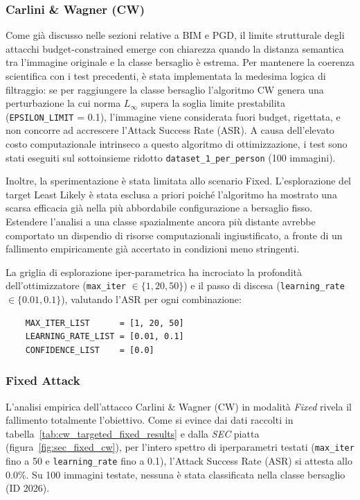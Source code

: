 \documentclass[a4paper, 12pt]{article}
\begin{document}
\subsubsection{Carlini \& Wagner (CW)}
Come già discusso nelle sezioni relative a BIM e PGD, il limite strutturale degli attacchi budget-constrained
emerge con chiarezza quando la distanza semantica tra l'immagine originale e la classe bersaglio è estrema. 
Per mantenere la coerenza scientifica con i test precedenti, è stata implementata la medesima logica di filtraggio: 
se per raggiungere la classe bersaglio l'algoritmo CW genera una perturbazione la cui norma $L_\infty$ supera la soglia
limite prestabilita (\texttt{EPSILON\_LIMIT} = 0.1), l'immagine viene considerata fuori budget, rigettata, e 
non concorre ad accrescere l'Attack Success Rate (ASR).
A causa dell'elevato costo computazionale intrinseco a questo algoritmo di ottimizzazione, 
i test sono stati eseguiti sul sottoinsieme ridotto \texttt{dataset\_1\_per\_person} (100 immagini). 

Inoltre, la sperimentazione è stata limitata allo scenario Fixed. L'esplorazione del target Least Likely
è stata esclusa a priori poiché l'algoritmo ha mostrato una scarsa efficacia già nella più abbordabile configurazione a 
bersaglio fisso. Estendere l'analisi a una classe spazialmente ancora più distante avrebbe comportato un dispendio di 
risorse computazionali ingiustificato, a fronte di un fallimento empiricamente già accertato in condizioni meno 
stringenti.

La griglia di esplorazione iper-parametrica ha incrociato la profondità dell'ottimizzatore 
(\texttt{max\_iter} $\in \{1, 20, 50\}$) e il passo di discesa (\texttt{learning\_rate} $\in \{0.01, 0.1\}$), 
valutando l'ASR per ogni combinazione:

\begin{verbatim}
    MAX_ITER_LIST      = [1, 20, 50]
    LEARNING_RATE_LIST = [0.01, 0.1]
    CONFIDENCE_LIST    = [0.0]
\end{verbatim}


\subsubsection*{Fixed Attack}
L'analisi empirica dell'attacco Carlini \& Wagner (CW) in modalità \textit{Fixed} rivela il fallimento totalmente l'obiettivo. Come si evince dai dati raccolti in tabella~\ref{tab:cw_targeted_fixed_results} e dalla \textit{SEC} piatta (figura~\ref{fig:sec_fixed_cw}), per l'intero spettro di iperparametri testati (\texttt{max\_iter} 
fino a 50 e \texttt{learning\_rate} fino a 0.1), l'Attack Success Rate (ASR) si attesta allo 0.0\%. Su 100 immagini testate, nessuna è stata classificata nella classe bersaglio (ID 2026).
\end{document}

